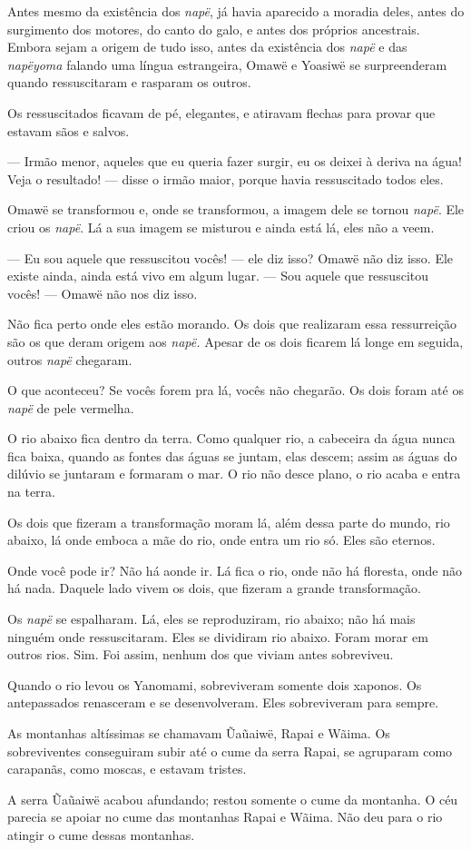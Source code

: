 Antes mesmo da existência dos \emph{napë}, já havia aparecido a moradia
deles, antes do surgimento dos motores, do canto do galo, e antes dos
próprios ancestrais. Embora sejam a origem de tudo isso, antes da
existência dos \emph{napë} e das \emph{napëyoma} falando uma língua
estrangeira, Omawë e Yoasiwë se surpreenderam quando ressuscitaram e
rasparam os outros. 

Os ressuscitados ficavam de pé, elegantes, e atiravam flechas para
provar que estavam sãos e salvos.

--- Irmão menor, aqueles que eu queria fazer surgir, eu os
deixei à deriva na água! Veja o resultado! --- disse o irmão maior,
porque havia ressuscitado todos eles. 

Omawë se transformou e, onde se transformou, a imagem dele se
tornou \emph{napë}. Ele criou os \emph{napë}. Lá a sua imagem se misturou
e ainda está lá, eles não a veem. 

--- Eu sou aquele que ressuscitou vocês! --- ele diz isso? Omawë não diz
isso. Ele existe ainda, ainda está vivo em algum lugar. --- Sou aquele que
ressuscitou vocês! --- Omawë não nos diz isso. 

Não fica perto onde eles estão morando. Os dois que realizaram essa
ressurreição são os que deram origem aos \emph{napë.} Apesar de os dois
ficarem lá longe em seguida, outros \emph{napë} chegaram. 

O que aconteceu? Se vocês forem pra lá, vocês não chegarão. Os dois
foram até os \emph{napë} de pele vermelha. 

O rio abaixo fica dentro da terra. Como qualquer rio, a cabeceira da
água nunca fica baixa, quando as fontes das águas se juntam, elas
descem; assim as águas do dilúvio se juntaram e formaram o mar. O rio
não desce plano, o rio acaba e entra na terra. 

Os dois que fizeram a transformação moram lá, além dessa parte do mundo,
rio abaixo, lá onde emboca a mãe do rio, onde entra um rio só. Eles são
eternos. 

Onde você pode ir? Não há aonde ir. Lá fica o rio, onde não há floresta,
onde não há nada. Daquele lado vivem os dois, que fizeram a grande
transformação. 

Os \emph{napë} se espalharam. Lá, eles se reproduziram, rio abaixo; não
há mais ninguém onde ressuscitaram. Eles se dividiram rio abaixo. Foram
morar em outros rios. Sim. Foi assim, nenhum dos que viviam
antes sobreviveu. 

Quando o rio levou os Yanomami, sobreviveram somente dois xaponos. Os
antepassados renasceram e se desenvolveram. Eles sobreviveram para
sempre. 

As montanhas altíssimas se chamavam Ũaũaiwë, Rapai e Wãima. Os
sobreviventes conseguiram subir até o cume da serra Rapai, se agruparam
como carapanãs, como moscas, e estavam tristes. 

A serra Ũaũaiwë acabou afundando; restou somente o cume da montanha. O céu parecia se apoiar no cume das montanhas Rapai e Wãima. Não deu para
o rio atingir o cume dessas montanhas. 
